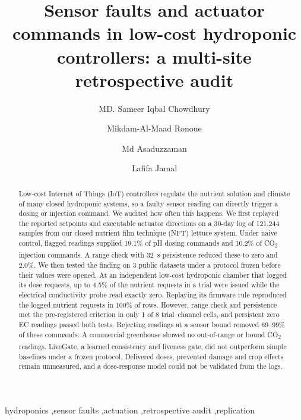 \documentclass[preprint,12pt,doubleblind]{elsarticle}
\newcommand{\COtwo}{CO\textsubscript{2}}
\begin{document}
\begin{frontmatter}

\title{Sensor faults and actuator commands in low-cost hydroponic controllers: a multi-site retrospective audit}

\ifdefined\AUDITBLINDED
\else
\author[du]{MD. Sameer Iqbal Chowdhury}
\author[du]{Mikdam-Al-Maad Ronoue}
\author[kuas]{Md Asaduzzaman}
\author[du]{Lafifa Jamal}
\fi

\begin{abstract}
Low-cost Internet of Things (IoT) controllers regulate the nutrient solution and climate of many closed hydroponic systems, so a faulty sensor reading can directly trigger a dosing or injection command. We audited how often this happens. We first replayed the reported setpoints and executable actuator directions on a 30-day log of 121,244 samples from our closed nutrient film technique (NFT) lettuce system. Under naive control, flagged readings supplied 19.1\% of pH dosing commands and 10.2\% of \COtwo{} injection commands. A range check with 32~s persistence reduced these to zero and 2.0\%. We then tested the finding on 3 public datasets under a protocol frozen before their values were opened. At an independent low-cost hydroponic chamber that logged its dose requests, up to 4.5\% of the nutrient requests in a trial were issued while the electrical conductivity probe read exactly zero. Replaying its firmware rule reproduced the logged nutrient requests in 100\% of rows. However, range check and persistence met the pre-registered criterion in only 1 of 8 trial--channel cells, and persistent zero EC readings passed both tests. Rejecting readings at a sensor bound removed 69--99\% of these commands. A commercial greenhouse showed no out-of-range or bound \COtwo{} readings. LiveGate, a learned consistency and liveness gate, did not outperform simple baselines under a frozen protocol. Delivered doses, prevented damage and crop effects remain unmeasured, and a dose-response model could not be validated from the logs.
\end{abstract}

\begin{keyword}
hydroponics \sep sensor faults \sep actuation \sep retrospective audit \sep replication
\end{keyword}

\end{frontmatter}
\end{document}
